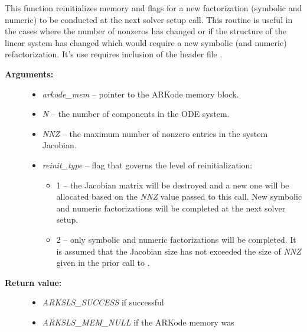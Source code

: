 \documentclass[letterpaper,10pt,english]{sphinxmanual}
\begin{document}
\begin{fulllineitems}
\label{c_interface/User_callable:c.ARKKLUReInit}
This function reinitializes memory and flags for a new
factorization (symbolic and numeric) to be conducted at the next
solver setup call.  This routine is useful in the cases where the
number of nonzeros has changed or if the structure of the linear
system has changed which would require a new symbolic (and
numeric) refactorization.  It's use requires inclusion of the
header file .
\begin{description}
\item[{\textbf{Arguments:}}] \leavevmode\begin{itemize}
\item {} 
\emph{arkode\_mem} -- pointer to the ARKode memory block.

\item {} 
\emph{N} -- the number of components in the ODE system.

\item {} 
\emph{NNZ} -- the maximum number of nonzero entries in the system
Jacobian.

\item {} 
\emph{reinit\_type} -- flag that governs the level of
reinitialization:
\begin{itemize}
\item {} 
1 -- the Jacobian matrix will be destroyed and a new one
will be allocated based on the \emph{NNZ} value passed to this
call.  New symbolic and numeric factorizations will be
completed at the next solver setup.

\item {} 
2 -- only symbolic and numeric factorizations will be
completed.  It is assumed that the Jacobian size has not
exceeded the size of \emph{NNZ} given in the prior call to
{\hyperref[c_interface/User_callable:c.ARKKLU]{\emph{}}}.

\end{itemize}

\end{itemize}

\item[{\textbf{Return value:}}] \leavevmode\begin{itemize}
\item {} 
\emph{ARKSLS\_SUCCESS}   if successful

\item {} 
\emph{ARKSLS\_MEM\_NULL}  if the ARKode memory was 


\end{itemize}
\end{description}
\end{fulllineitems}
\end{document}
